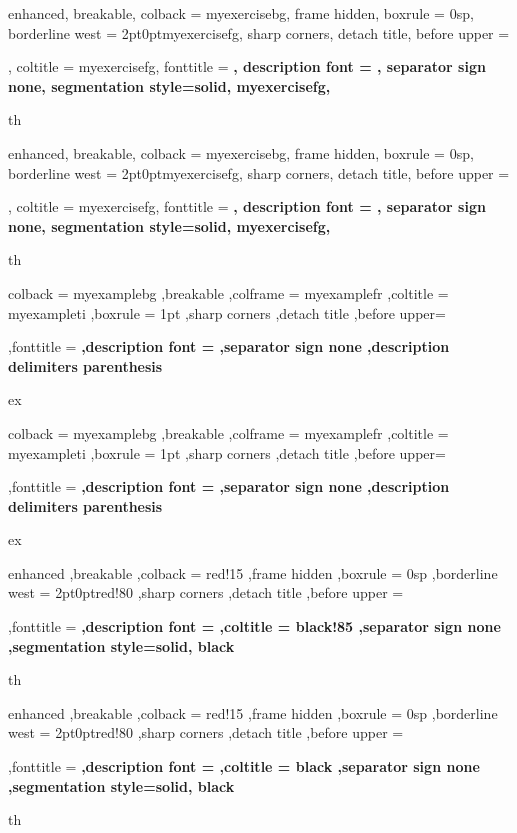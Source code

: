 
{%
	enhanced,
	breakable,
	colback = myexercisebg,
	frame hidden,
	boxrule = 0sp,
	borderline west = {2pt}{0pt}{myexercisefg},
	sharp corners,
	detach title,
	before upper = \tcbtitle\par\smallskip,
	coltitle = myexercisefg,
	fonttitle = \bfseries\sffamily,
	description font = \mdseries,
	separator sign none,
	segmentation style={solid, myexercisefg},
}
{th}

{%
	enhanced,
	breakable,
	colback = myexercisebg,
	frame hidden,
	boxrule = 0sp,
	borderline west = {2pt}{0pt}{myexercisefg},
	sharp corners,
	detach title,
	before upper = \tcbtitle\par\smallskip,
	coltitle = myexercisefg,
	fonttitle = \bfseries\sffamily,
	description font = \mdseries,
	separator sign none,
	segmentation style={solid, myexercisefg},
}
{th}


{%
	colback = myexamplebg
	,breakable
	,colframe = myexamplefr
	,coltitle = myexampleti
	,boxrule = 1pt
	,sharp corners
	,detach title
	,before upper=\tcbtitle\par\smallskip
	,fonttitle = \bfseries\sffamily
	,description font = \mdseries
	,separator sign none
	,description delimiters parenthesis
}
{ex}

{%
	colback = myexamplebg
	,breakable
	,colframe = myexamplefr
	,coltitle = myexampleti
	,boxrule = 1pt
	,sharp corners
	,detach title
	,before upper=\tcbtitle\par\smallskip
	,fonttitle = \bfseries\sffamily
	,description font = \mdseries
	,separator sign none
	,description delimiters parenthesis
}
{ex}

{%
    enhanced
    ,breakable
    ,colback = red!15
    ,frame hidden
    ,boxrule = 0sp
    ,borderline west = {2pt}{0pt}{red!80}
    ,sharp corners
    ,detach title
    ,before upper = \tcbtitle\par\smallskip
    ,fonttitle = \bfseries\sffamily
	,description font = \mdseries
    ,coltitle = black!85
    ,separator sign none
    ,segmentation style={solid, black}
}
{th}
{%
    enhanced
    ,breakable
    ,colback = red!15
    ,frame hidden
    ,boxrule = 0sp
    ,borderline west = {2pt}{0pt}{red!80}
    ,sharp corners
    ,detach title
    ,before upper = \tcbtitle\par\smallskip
    ,fonttitle = \bfseries\sffamily
	,description font = \mdseries
    ,coltitle = black
    ,separator sign none
    ,segmentation style={solid, black}
}
{th}


